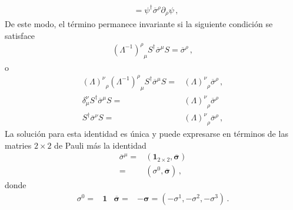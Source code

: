 \begin{frame}
\begin{align}
&=\psi^{\dagger}\overline{\sigma}^\rho\partial_\rho\psi\,,
\end{align}
De este modo, el término permanece invariante si la siguiente condición se satisface
\begin{align}
 {\left(\Lambda^{-1}\right)^\rho}_\mu  S^{\dagger}\overline{\sigma}^\mu S=\overline{\sigma}^\rho\,,
\end{align}
o
\begin{align}
\label{eq:ltrincond}
{\left(\Lambda\right)^\nu}_\rho{\left(\Lambda^{-1}\right)^\rho}_\mu   S^{\dagger}\overline{\sigma}^\mu S=&
{\left(\Lambda\right)^\nu}_\rho \overline{\sigma}^\rho\,,\nonumber\\
\delta^{\nu}_{\mu}   S^{\dagger}\overline{\sigma}^\mu S=&
{\left(\Lambda\right)^\nu}_\rho \overline{\sigma}^\rho \nonumber\\
S^{\dagger}\overline{\sigma}^\nu S=&{\left(\Lambda\right)^\nu}_\rho \overline{\sigma}^\rho\,,
\end{align}
La solución para esta identidad es única y puede expresarse en términos de las matries  $2\times2$ de Pauli más la identidad
   \begin{align} 
 \overline{\sigma}^{\mu}=& \left( \mathbf{1}_{2\times2},\overline{\boldsymbol{\sigma}} \right) \nonumber\\
 =& \left( \sigma^0,\overline{\boldsymbol{\sigma}} \right)\,, 
\end{align}
donde
\begin{align}
\sigma^0=& \mathbf{1} & \overline{\boldsymbol{\sigma}}=&-\boldsymbol{\sigma}=\left(-\sigma^1,-\sigma^2,-\sigma^3\right)\,.
\end{align}
\end{frame}
